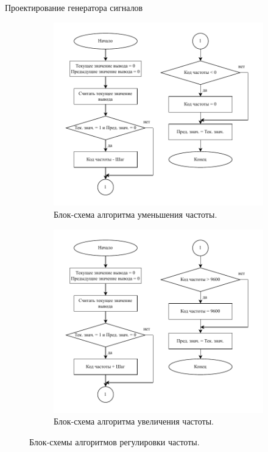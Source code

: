 \documentclass[10pt]{beamer}
\begin{document}
\begin{frame}{Проектирование генератора сигналов}
\begin{figure}
     \begin{subfigure}[H]{0.425\textwidth}
         \centering
         \includegraphics[width=1.3\textwidth]{minus_freq}
         \caption{Блок-схема алгоритма уменьшения частоты.}
     \end{subfigure}
     \hfill
     \begin{subfigure}[H]{0.425\textwidth}
         \centering
         \includegraphics[width=1.3\textwidth]{plus_freq}
         \caption{Блок-схема алгоритма увеличения частоты.}
     \end{subfigure}
        \caption{Блок-схемы алгоритмов регулировки частоты.}
\end{figure}
\end{frame}
\end{document}
